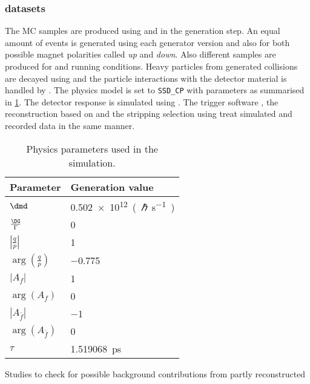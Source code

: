 \subsubsection{\MC datasets}
\label{sec:measurement_of_sin2beta:data_preparation:datasamples:mc}

The \acf{MC} samples are produced using \PythiaSix and \PythiaEight in the
generation step. An equal amount of events is generated using each generator
version and also for both possible magnet polarities called \emph{up} and
\emph{down}. Also different samples are produced for \catOO and \catOT running
conditions. Heavy particles from generated \protonproton collisions are decayed
using \EvtGen and the particle interactions with the \LHCb detector material is
handled by \GeantFour. The \EvtGen physics model is set to \Verb=SSD_CP= with
parameters as summarised in
\cref{tab:measurement_of_sin2beta:data_preparation:datasamples:mc:decfile}. The
detector response is simulated using \Boole. The \LHCb trigger software \Moore,
the reconstruction based on \Brunel and the stripping selection using \DaVinci
treat simulated and recorded data in the same manner.
%
\begin{table}[!htb]
\centering
\caption{Physics parameters used in the simulation.}
\label{tab:measurement_of_sin2beta:data_preparation:datasamples:mc:decfile}
\begin{tabular}{ll}
\toprule
Parameter                            & Generation value \\
\midrule
$\dmd$                               & \SI{0.502e12}{(\planckbar\per\second)} \\
$\frac{\DG}{\Gamma}$                 & \num{0} \\
$\left\vert\frac{q}{p}\right\vert$   & \num{1} \\
$\arg(\frac{q}{p})$                  & \num{-0.775} \\
$\vert A_f \vert$                    & \num{1} \\
$\arg(A_f)$                          & \num{0} \\
$\left\vert A_{\bar{f}} \right\vert$ & \num{-1}  \\
$\arg(A_{\bar{f}})$                  & \num{0} \\
$\tau$                               & \SI{1.519068}{\pico\second}\\
\bottomrule
\end{tabular}
\end{table}
%
Studies to check for possible background contributions from partly reconstructed
